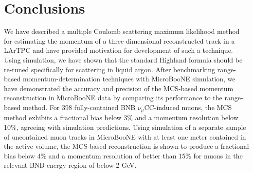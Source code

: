 \documentclass[a4paper,11pt]{article}
\begin{document}
\section{Conclusions}
We have described a multiple Coulomb scattering maximum likelihood method for estimating the momentum of a three dimensional reconstructed track in a LArTPC and have provided motivation for development of such a technique. Using simulation, we have shown that the standard Highland formula should be re-tuned specifically for scattering in liquid argon. After benchmarking range-based momentum-determination techniques with MicroBooNE simulation, we have demonstrated the accuracy and precision of the MCS-based momentum reconstruction in MicroBooNE data by comparing its performance to the range-based method. For 398 fully-contained BNB $\nu_\mu$CC-induced muons, the MCS method exhibits a fractional bias below 3\% and a momentum resolution below 10\%, agreeing with simulation predictions. Using simulation of a separate sample of uncontained muon tracks in MicroBooNE with at least one meter contained in the active volume, the MCS-based reconstruction is shown to produce a fractional bias below 4\% and a momentum resolution of better than 15\% for muons in the relevant BNB energy region of below 2 GeV.
\end{document}
